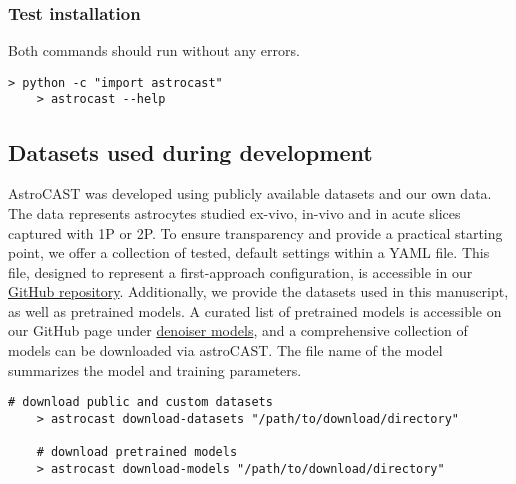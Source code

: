 \subsubsection{Test installation}

Both commands should run without any errors.

\begin{lstlisting}[style=bashStyle]
    > python -c "import astrocast"
    > astrocast --help
\end{lstlisting}

\subsection{Datasets used during development}
\label{ref:dataset-availability}

AstroCAST was developed using publicly available datasets and our own data. The data represents astrocytes studied ex-vivo, in-vivo and in acute slices captured with \ac{1P} or \ac{2P}. To ensure transparency and provide a practical starting point, we offer a collection of tested, default settings within a YAML file. This file, designed to represent a first-approach configuration, is accessible in our \href{https://github.com/janreising/astroCAST}{GitHub repository}. Additionally, we provide the datasets used in this manuscript, as well as pretrained models. A curated list of pretrained models is accessible on our GitHub page under \href{https://github.com/janreising/astroCAST/tree/main/denoiser_models}{denoiser models}, and a comprehensive collection of models can be downloaded via astroCAST. The file name of the model summarizes the model and training parameters.

\begin{lstlisting}[style=bashStyle]
    # download public and custom datasets
    > astrocast download-datasets "/path/to/download/directory"

    # download pretrained models
    > astrocast download-models "/path/to/download/directory"
\end{lstlisting}